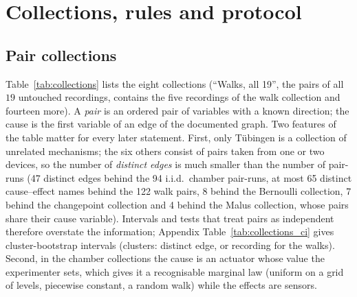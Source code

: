 \section{Collections, rules and protocol}\label{sec:data}

\subsection{Pair collections}\label{sec:collections}
Table~\ref{tab:collections} lists the eight collections (``Walks, all 19'', the pairs of all $19$ untouched recordings, contains the five recordings of the walk collection and fourteen more). A \emph{pair} is an ordered pair of variables with a known direction; the cause is the first variable of an edge of the documented graph. Two features of the table matter for every later statement. First, only T\"ubingen is a collection of unrelated mechanisms; the six others consist of pairs taken from one or two devices, so the number of \emph{distinct edges} is much smaller than the number of pair-runs (47 distinct edges behind the 94 i.i.d.\ chamber pair-runs, at most 65 distinct cause--effect names behind the 122 walk pairs, 8 behind the Bernoulli collection, 7 behind the changepoint collection and 4 behind the Malus collection, whose pairs share their cause variable). Intervals and tests that treat pairs as independent therefore overstate the information; Appendix Table~\ref{tab:collections_ci} gives cluster-bootstrap intervals (clusters: distinct edge, or recording for the walks). Second, in the chamber collections the cause is an actuator whose value the experimenter sets, which gives it a recognisable marginal law (uniform on a grid of levels, piecewise constant, a random walk) while the effects are sensors.

